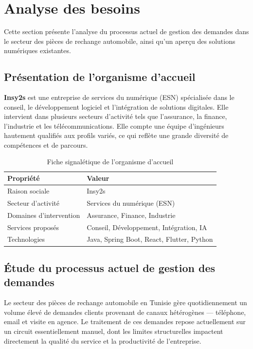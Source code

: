 \section{Analyse des besoins}
\label{sec:analyse}

Cette section pr\'{e}sente l'analyse du processus actuel de gestion des demandes dans le secteur des pi\`{e}ces de rechange automobile, ainsi qu'un aper\c{c}u des solutions num\'{e}riques existantes.

\subsection{Pr\'{e}sentation de l'organisme d'accueil}

\textbf{Insy2s} est une entreprise de services du num\'{e}rique (ESN) sp\'{e}cialis\'{e}e dans le conseil, le d\'{e}veloppement logiciel et l'int\'{e}gration de solutions digitales. Elle intervient dans plusieurs secteurs d'activit\'{e} tels que l'assurance, la finance, l'industrie et les t\'{e}l\'{e}communications. Elle compte une \'{e}quipe d'ing\'{e}nieurs hautement qualifi\'{e}s aux profils vari\'{e}s, ce qui refl\`{e}te une grande diversit\'{e} de comp\'{e}tences et de parcours.

\begin{table}[H]
\centering
\caption{Fiche signal\'{e}tique de l'organisme d'accueil}
\label{tab:fiche}
\begin{tabular}{|p{5cm}|p{8cm}|}
\hline
\textbf{Propri\'{e}t\'{e}} & \textbf{Valeur} \\
\hline
Raison sociale & Insy2s \\
\hline
Secteur d'activit\'{e} & Services du num\'{e}rique (ESN) \\
\hline
Domaines d'intervention & Assurance, Finance, Industrie \\
\hline
Services propos\'{e}s & Conseil, D\'{e}veloppement, Int\'{e}gration, IA \\
\hline
Technologies & Java, Spring Boot, React, Flutter, Python \\
\hline
\end{tabular}
\end{table}

\subsection{\'{E}tude du processus actuel de gestion des demandes}

Le secteur des pi\`{e}ces de rechange automobile en Tunisie g\`{e}re quotidiennement un volume \'{e}lev\'{e} de demandes clients provenant de canaux h\'{e}t\'{e}rog\`{e}nes --- t\'{e}l\'{e}phone, email et visite en agence. Le traitement de ces demandes repose actuellement sur un circuit essentiellement manuel, dont les limites structurelles impactent directement la qualit\'{e} du service et la productivit\'{e} de l'entreprise.

